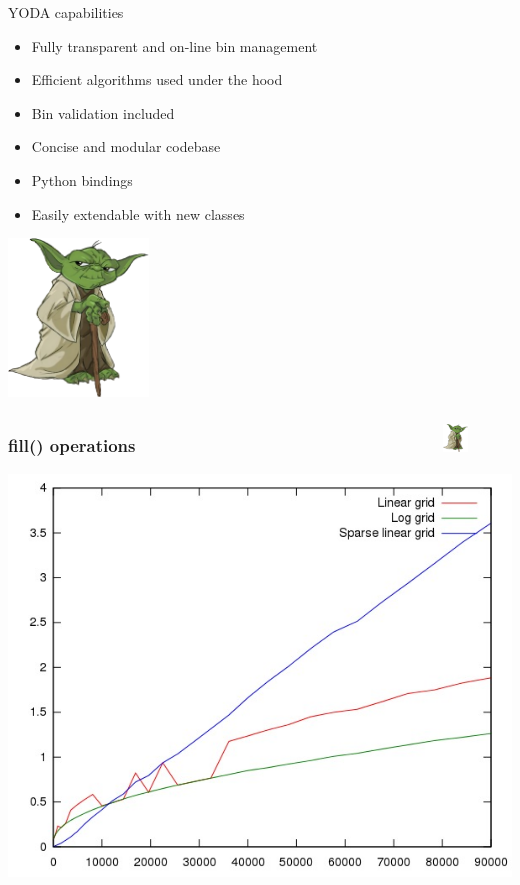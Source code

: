 \documentclass{beamer}
\begin{document}
  \begin{frame}{YODA capabilities}
    \begin{itemize}[<uncover@+>]
      \item Fully transparent and on-line bin management
      \item Efficient algorithms used under the hood
      \item Bin validation included
      \item Concise and modular codebase
      \item Python bindings 
      \item Easily extendable with new classes
    \end{itemize}
    \includegraphics[width=0.28\textwidth]{yoda-logo}
  \end{frame}

  \begin{frame}
      \frametitle{fill() operations \ \ \ \ \ \ \ \ \ \ \ \ \ \ \ \ \ \ \ \ \ \ \ \ \ \ \ \ \ \ \ \   \includegraphics[width=0.05\textwidth]{yoda-logo}}
      \includegraphics[height=0.89\textheight]{1.jpg}
  \end{frame}
\end{document}
